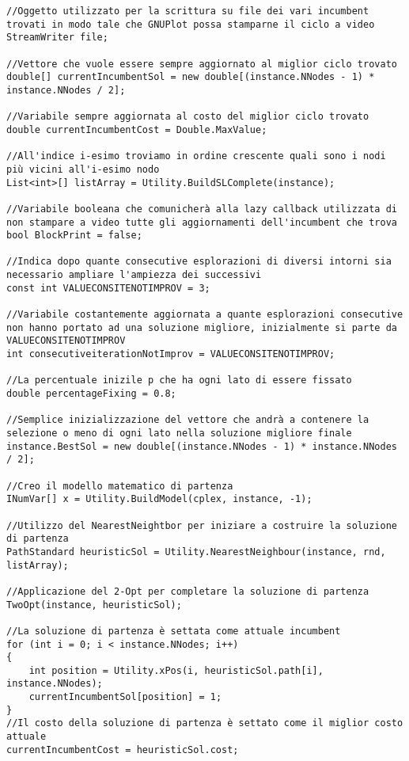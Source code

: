\documentclass[11pt]{article}
\begin{document}
\begin{lstlisting}
//Oggetto utilizzato per la scrittura su file dei vari incumbent trovati in modo tale che GNUPlot possa stamparne il ciclo a video
StreamWriter file;

//Vettore che vuole essere sempre aggiornato al miglior ciclo trovato
double[] currentIncumbentSol = new double[(instance.NNodes - 1) * instance.NNodes / 2];

//Variabile sempre aggiornata al costo del miglior ciclo trovato
double currentIncumbentCost = Double.MaxValue;

//All'indice i-esimo troviamo in ordine crescente quali sono i nodi più vicini all'i-esimo nodo
List<int>[] listArray = Utility.BuildSLComplete(instance);

//Variabile booleana che comunicherà alla lazy callback utilizzata di non stampare a video tutte gli aggiornamenti dell'incumbent che trova
bool BlockPrint = false;

//Indica dopo quante consecutive esplorazioni di diversi intorni sia necessario ampliare l'ampiezza dei successivi
const int VALUECONSITENOTIMPROV = 3;

//Variabile costantemente aggiornata a quante esplorazioni consecutive non hanno portato ad una soluzione migliore, inizialmente si parte da VALUECONSITENOTIMPROV
int consecutiveiterationNotImprov = VALUECONSITENOTIMPROV;

//La percentuale inizile p che ha ogni lato di essere fissato
double percentageFixing = 0.8;

//Semplice inizializzazione del vettore che andrà a contenere la selezione o meno di ogni lato nella soluzione migliore finale
instance.BestSol = new double[(instance.NNodes - 1) * instance.NNodes / 2];

//Creo il modello matematico di partenza
INumVar[] x = Utility.BuildModel(cplex, instance, -1);

//Utilizzo del NearestNeightbor per iniziare a costruire la soluzione di partenza
PathStandard heuristicSol = Utility.NearestNeighbour(instance, rnd, listArray);

//Applicazione del 2-Opt per completare la soluzione di partenza
TwoOpt(instance, heuristicSol);

//La soluzione di partenza è settata come attuale incumbent
for (int i = 0; i < instance.NNodes; i++)
{
    int position = Utility.xPos(i, heuristicSol.path[i], instance.NNodes);
    currentIncumbentSol[position] = 1;
}
//Il costo della soluzione di partenza è settato come il miglior costo attuale
currentIncumbentCost = heuristicSol.cost;


\end{lstlisting}
\end{document}
